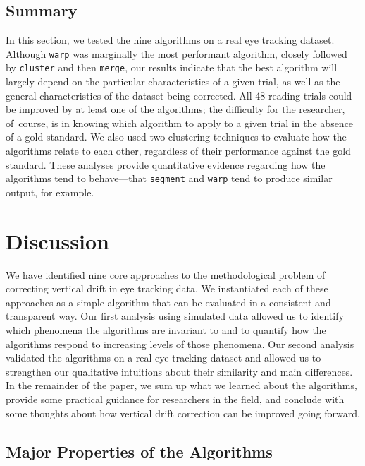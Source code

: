 \documentclass[doc,biblatex]{apa7}
\begin{document}
\subsection{Summary}

In this section, we tested the nine algorithms on a real eye tracking dataset. Although \texttt{warp} was marginally the most performant algorithm, closely followed by \texttt{cluster} and then \texttt{merge}, our results indicate that the best algorithm will largely depend on the particular characteristics of a given trial, as well as the general characteristics of the dataset being corrected. All 48 reading trials could be improved by at least one of the algorithms; the difficulty for the researcher, of~course, is in knowing which algorithm to apply to a given trial in the absence of a gold standard. We also used two clustering techniques to evaluate how the algorithms relate to each other, regardless of their performance against the gold standard. These analyses provide quantitative evidence regarding how the algorithms tend to behave---that \texttt{segment} and \texttt{warp} tend to produce similar output, for example.

\section{Discussion}

We have identified nine core approaches to the methodological problem of correcting vertical drift in eye tracking data. We instantiated each of these approaches as a simple algorithm that can be evaluated in a consistent and transparent way. Our first analysis using simulated data allowed us to identify which phenomena the algorithms are invariant to and to quantify how the algorithms respond to increasing levels of those phenomena. Our second analysis validated the algorithms on a real eye tracking dataset and allowed us to strengthen our qualitative intuitions about their similarity and main differences. In the remainder of the paper, we sum up what we learned about the algorithms, provide some practical guidance for researchers in the field, and conclude with some thoughts about how vertical drift correction can be improved going forward. 

\subsection{Major Properties of the Algorithms}
\end{document}
